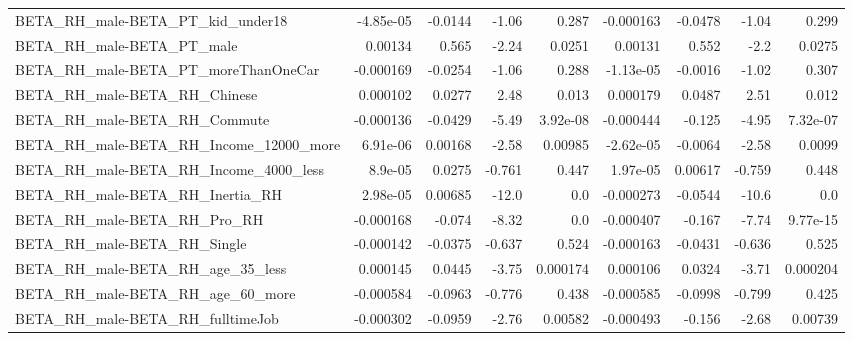 \begin{tabular}{lrrrrrrrr}
BETA\_RH\_male-BETA\_PT\_kid\_under18                   &   -4.85e-05 &      -0.0144 &    -1.06 &    0.287 &  -0.000163 &     -0.0478 &        -1.04 &         0.299 \\
BETA\_RH\_male-BETA\_PT\_male                          &     0.00134 &        0.565 &    -2.24 &   0.0251 &    0.00131 &       0.552 &         -2.2 &        0.0275 \\
BETA\_RH\_male-BETA\_PT\_moreThanOneCar                &   -0.000169 &      -0.0254 &    -1.06 &    0.288 &  -1.13e-05 &     -0.0016 &        -1.02 &         0.307 \\
BETA\_RH\_male-BETA\_RH\_Chinese                       &    0.000102 &       0.0277 &     2.48 &    0.013 &   0.000179 &      0.0487 &         2.51 &         0.012 \\
BETA\_RH\_male-BETA\_RH\_Commute                       &   -0.000136 &      -0.0429 &    -5.49 & 3.92e-08 &  -0.000444 &      -0.125 &        -4.95 &      7.32e-07 \\
BETA\_RH\_male-BETA\_RH\_Income\_12000\_more             &    6.91e-06 &      0.00168 &    -2.58 &  0.00985 &  -2.62e-05 &     -0.0064 &        -2.58 &        0.0099 \\
BETA\_RH\_male-BETA\_RH\_Income\_4000\_less              &     8.9e-05 &       0.0275 &   -0.761 &    0.447 &   1.97e-05 &     0.00617 &       -0.759 &         0.448 \\
BETA\_RH\_male-BETA\_RH\_Inertia\_RH                    &    2.98e-05 &      0.00685 &    -12.0 &      0.0 &  -0.000273 &     -0.0544 &        -10.6 &           0.0 \\
BETA\_RH\_male-BETA\_RH\_Pro\_RH                        &   -0.000168 &       -0.074 &    -8.32 &      0.0 &  -0.000407 &      -0.167 &        -7.74 &      9.77e-15 \\
BETA\_RH\_male-BETA\_RH\_Single                        &   -0.000142 &      -0.0375 &   -0.637 &    0.524 &  -0.000163 &     -0.0431 &       -0.636 &         0.525 \\
BETA\_RH\_male-BETA\_RH\_age\_35\_less                   &    0.000145 &       0.0445 &    -3.75 & 0.000174 &   0.000106 &      0.0324 &        -3.71 &      0.000204 \\
BETA\_RH\_male-BETA\_RH\_age\_60\_more                   &   -0.000584 &      -0.0963 &   -0.776 &    0.438 &  -0.000585 &     -0.0998 &       -0.799 &         0.425 \\
BETA\_RH\_male-BETA\_RH\_fulltimeJob                   &   -0.000302 &      -0.0959 &    -2.76 &  0.00582 &  -0.000493 &      -0.156 &        -2.68 &       0.00739 \\

\end{tabular}
